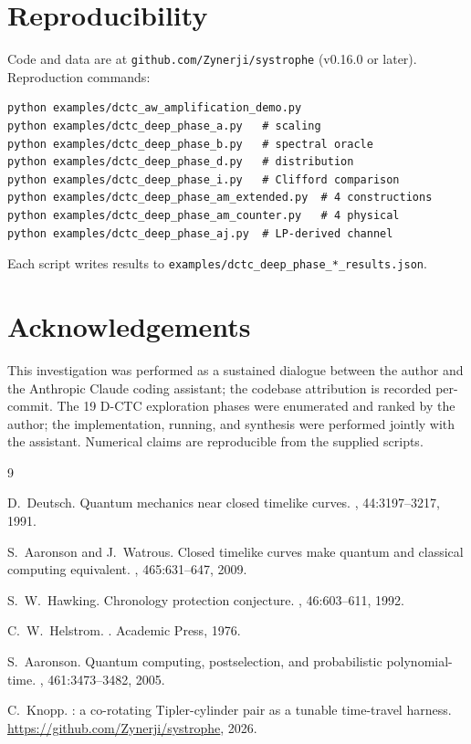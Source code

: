 \documentclass[11pt,a4paper]{article}
\begin{document}
\section{Reproducibility}

Code and data are at \texttt{github.com/Zynerji/systrophe} (v0.16.0
or later). Reproduction commands:

\begin{verbatim}
python examples/dctc_aw_amplification_demo.py
python examples/dctc_deep_phase_a.py   # scaling
python examples/dctc_deep_phase_b.py   # spectral oracle
python examples/dctc_deep_phase_d.py   # distribution
python examples/dctc_deep_phase_i.py   # Clifford comparison
python examples/dctc_deep_phase_am_extended.py  # 4 constructions
python examples/dctc_deep_phase_am_counter.py   # 4 physical
python examples/dctc_deep_phase_aj.py  # LP-derived channel
\end{verbatim}

Each script writes results to \texttt{examples/dctc\_deep\_phase\_*\_results.json}.

\section*{Acknowledgements}

This investigation was performed as a sustained dialogue between the
author and the Anthropic Claude coding assistant; the codebase
attribution is recorded per-commit. The 19 D-CTC exploration phases
were enumerated and ranked by the author; the implementation,
running, and synthesis were performed jointly with the assistant.
Numerical claims are reproducible from the supplied scripts.


\begin{thebibliography}{9}

D.~Deutsch.
\newblock Quantum mechanics near closed timelike curves.
, 44:3197--3217, 1991.

S.~Aaronson and J.~Watrous.
\newblock Closed timelike curves make quantum and classical computing
equivalent.
, 465:631--647, 2009.

S.~W.~Hawking.
\newblock Chronology protection conjecture.
, 46:603--611, 1992.

C.~W.~Helstrom.
.
\newblock Academic Press, 1976.

S.~Aaronson.
\newblock Quantum computing, postselection, and probabilistic
polynomial-time.
, 461:3473--3482, 2005.

C.~Knopp.
: a co-rotating Tipler-cylinder pair as a tunable
time-travel harness.
\newblock \url{https://github.com/Zynerji/systrophe}, 2026.

\end{thebibliography}
\end{document}
